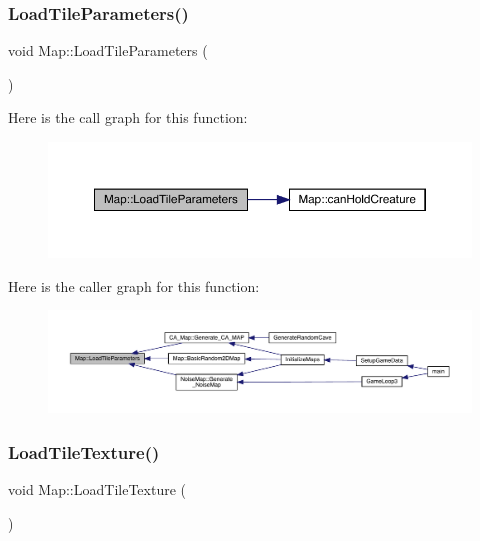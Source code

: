 \subsubsection{\texorpdfstring{Load\+Tile\+Parameters()}{LoadTileParameters()}}
{\footnotesize\ttfamily void Map\+::\+Load\+Tile\+Parameters (\begin{DoxyParamCaption}{ }\end{DoxyParamCaption})}

Here is the call graph for this function\+:
\nopagebreak
\begin{figure}[H]
\begin{center}
\leavevmode
\includegraphics[width=350pt]{class_map_a4e045e2e1df74c3fcba4b860f240d498_cgraph}
\end{center}
\end{figure}
Here is the caller graph for this function\+:
\nopagebreak
\begin{figure}[H]
\begin{center}
\leavevmode
\includegraphics[width=350pt]{class_map_a4e045e2e1df74c3fcba4b860f240d498_icgraph}
\end{center}
\end{figure}
\mbox{\label{class_map_ab64e7930cd811d847dbbee056b1e2fb0}} 
\subsubsection{\texorpdfstring{Load\+Tile\+Texture()}{LoadTileTexture()}}
{\footnotesize\ttfamily void Map\+::\+Load\+Tile\+Texture (\begin{DoxyParamCaption}{ }\end{DoxyParamCaption})}

